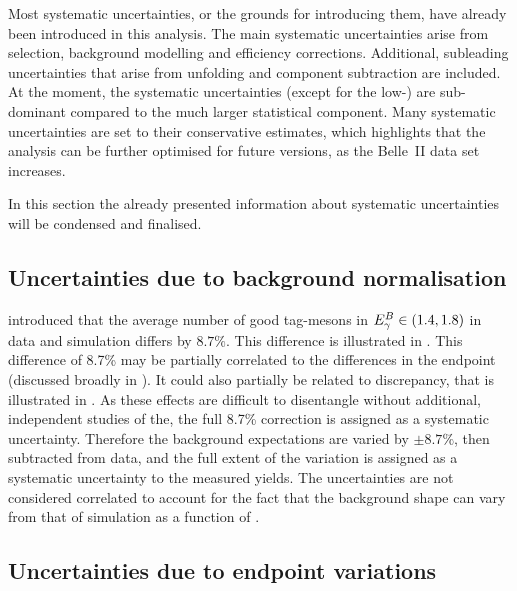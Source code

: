 Most systematic uncertainties, or the grounds for introducing them, have already been introduced in this analysis.
The main systematic uncertainties arise from selection, background modelling and efficiency corrections.
Additional, subleading uncertainties that arise from unfolding and \BtoXdgamma component subtraction are included.
At the moment, the systematic uncertainties (except for the low-\EB) are sub-dominant compared to the much larger statistical component.
Many systematic uncertainties are set to their conservative estimates, 
which highlights that the analysis can be further optimised for future versions, as the Belle~II data set increases.

In this section the already presented information about systematic uncertainties will be condensed and finalised.


\subsection{Uncertainties due to background normalisation}\label{sec:background_normalisation_systematic}

 introduced that the average number of 
good tag-\B mesons in ${E^B_{\gamma}}\in(1.4,1.8)$ in data and simulation differs by $8.7\%$.
This difference is illustrated in .
This difference of 8.7\% may be partially correlated to the differences in the \Mbc endpoint (discussed broadly in ).
It could also partially be related to \ZMVA discrepancy, that is illustrated in .
As these effects are difficult to disentangle without additional, independent studies of the, the full 8.7\% correction is assigned as a systematic uncertainty.
Therefore the background expectations are varied by $\pm 8.7\%$, then subtracted from data, and the full extent of the variation is assigned as a systematic uncertainty to the measured \BtoXsgamma yields.
The uncertainties are not considered correlated to account for the fact that the background shape can vary from that of simulation as a function of \EB.

\subsection{Uncertainties due to \texorpdfstring{\Mbc}{Mbc} endpoint variations}\label{sec:fit_endpoint_systematic}

